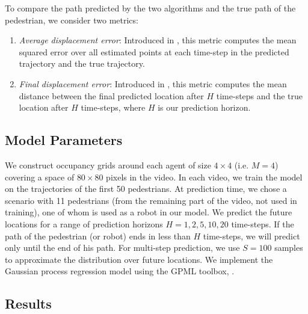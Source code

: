 To compare the path predicted by the two algorithms and the true path
of the pedestrian, we consider two metrics:
\begin{enumerate}
\item \textit{Average displacement error}: Introduced in
  \cite{pellegrini09}, this metric computes the mean squared error
  over all estimated points at each time-step in the predicted
  trajectory and the true trajectory.
\item \textit{Final displacement error}: Introduced in \cite{alahi16},
  this metric computes the mean distance between the final predicted
  location after $H$ time-steps and the true location after $H$
  time-steps, where $H$ is our prediction horizon.
\end{enumerate}

\subsection{Model Parameters}
\label{sec:oigp-model-parameters}

We construct occupancy grids around each agent of size $4 \times 4$ (i.e. $M=4$) covering a space of $80 \times 80$ pixels in the video. In each video, we train the model on the trajectories of the first 50 pedestrians. At prediction time, we chose a scenario with 11 pedestrians (from the remaining part of the video, not used in training), one of whom is used as a robot in our model. We predict the future locations for a range of prediction horizons $H = 1,2,5,10,20$ time-steps. If the path of the pedestrian (or robot) ends in less than $H$ time-steps, we will predict only until the end of his path. For multi-step prediction, we use $S = 100$ samples to approximate the distribution over future locations. We implement the Gaussian process regression model using the GPML toolbox, \cite{rasmussen06}.


\subsection{Results}
\label{sec:oigp-results}

